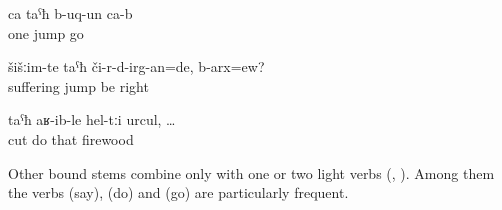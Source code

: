 \begin{exe}
	\ex	\label{ex:One (boar) jumped (down)}
	\gll	ca	taˁħ	b-uq-un	ca-b\\
		one	jump	go	\\
	\glt	{}

	\ex	\label{ex:I would distract from the sorrows, right}
	\gll	šišːim-te	taˁħ	či-r-d-irg-an=de,	b-arx=ew?\\
		suffering	jump	be	right\\
	\glt	{}

	\ex	\label{ex:when (they) cut off the wood}
	\gll	taˁħ	aʁ-ib-le	hel-tːi	urcul,	\ldots\\
		cut	do	that	firewood\\
	\glt	{}
\end{exe}

Other bound stems combine only with one or two light verbs (, ). Among them the verbs  (say),  (do) and  (go) are particularly frequent.

